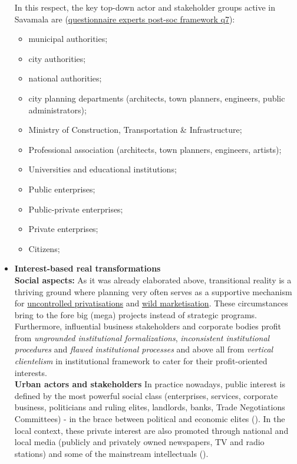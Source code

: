\documentclass[11pt]{report}
\begin{document}
\begin{itemize}
In this respect, the key top-down actor and stakeholder groups active in Savamala are (\href{}{questionnaire experts post-soc framework q7}):

\begin{itemize}
\item municipal authorities;
\item city authorities;
\item national authorities;
\item city planning departments (architects, town planners, engineers, public administrators);
\item Ministry of Construction, Transportation \& Infrastructure;
\item Professional association (architects, town planners, engineers, artists);
\item Universities and educational institutions;
\item Public enterprises;
\item Public-private enterprises;
\item Private enterprises;
\item Citizens;
\end{itemize}

\item \textbf{Interest-based real transformations}
\\

\textbf{Social aspects:}
As it was already elaborated above, transitional reality is a thriving ground where planning very often serves as a supportive mechanism for
\underline{uncontrolled privatisations} and \underline{wild marketisation}.
These circumstances bring to the fore big (mega) projects instead of strategic programs.
Furthermore, influential business stakeholders and corporate bodies profit from
\textit{ungrounded institutional formalizations}, \textit{inconsistent institutional procedures} and \textit{flawed institutional processes} and above all from \textit{vertical clientelism} in institutional framework to cater for their profit-oriented interests.
\\

\textbf{Urban actors and stakeholders}
In  practice nowadays, public interest is defined by the most powerful social class (enterprises, services, corporate business, politicians and ruling elites, landlords, banks, Trade Negotiations Committees) - in the brace between political and economic elites (\cite{ Urbani razvoj u Srbiji Ministry of Space 2014}).
In the local context, these private interest are also promoted through national and local media (publicly and privately owned newspapers, TV and radio stations) and some of the mainstream intellectuals (\cite{cenzolovka tamara tekst}).


\end{itemize}
\end{document}

